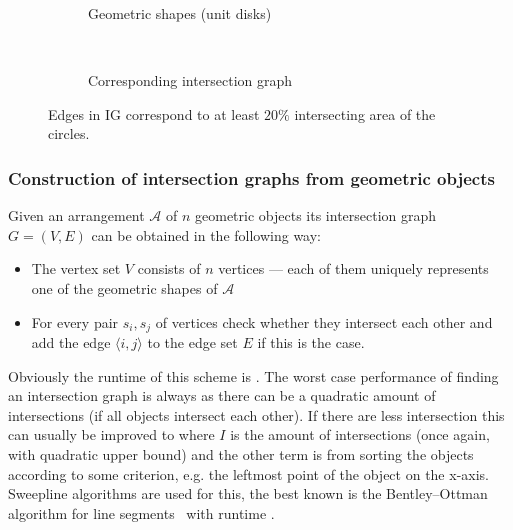   \begin{figure*}[!h]
    \centering
    \begin{subfigure}[t]{0.5\textwidth}
        \centering

   \caption{Geometric shapes (unit disks)}
\end{subfigure}%
  ~ 
 \begin{subfigure}[t]{0.5\textwidth}
      \centering
{}
      \caption{Corresponding intersection graph}
    \end{subfigure}
    \caption{Edges in IG correspond to at least $20\%$ intersecting area of the circles.}\label{fig:igex2}
\end{figure*}


\subsubsection{Construction of intersection graphs from geometric objects}
Given an arrangement $\mathcal A$ of $n$ geometric objects its intersection graph $G=(V,E)$ can be obtained in the following way: 
\begin{itemize}
\item The vertex set $V$ consists of $n$ vertices --- each of them uniquely represents one of the geometric shapes of $\mathcal A$
\item For every pair $s_i, s_j$ of vertices check whether they intersect each other and add the edge $\langle i, j\rangle$ to the edge set $E$ if this is the case. 
\end{itemize}
Obviously the runtime of this scheme is . The worst case performance of finding an intersection graph is always  as there can be a quadratic amount of intersections (if all objects intersect each other). If there are less intersection this can usually be improved to  where $I$ is the amount of intersections (once again, with quadratic upper bound) and the other term is from sorting the objects according to some criterion, e.g. the leftmost point of the object on the x-axis. Sweepline algorithms are used for this, the best known is the Bentley--Ottman algorithm for line segments~\cite{bentleyott} with runtime . 

